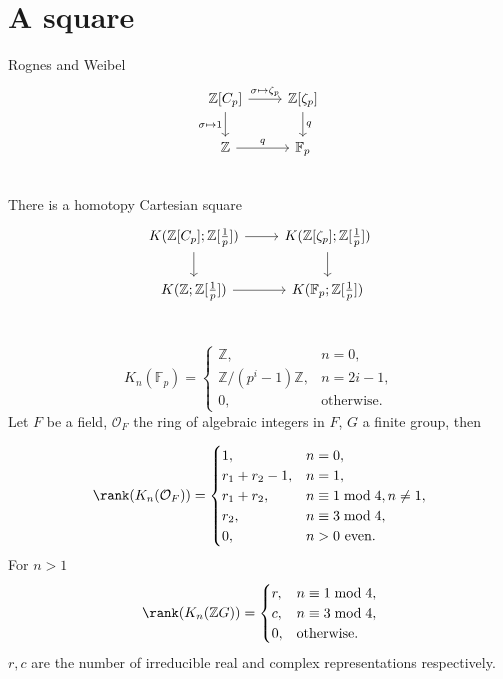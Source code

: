 \section{A square} %
Rognes and Weibel
\begin{equation}
	\begin{tikzcd}
		\mathbb{Z}[C_p] \ar[r,"\sigma\mapsto \zeta_p"] \ar[d,"\sigma\mapsto 1"']& \mathbb{Z}[\zeta_p]\ar[d,"q"]\\
		 \mathbb{Z}\ar[r,"q"] & \mathbb{F}_p\\
	\end{tikzcd}
\end{equation}
There is a homotopy Cartesian square
\begin{equation}
	\begin{tikzcd}
		K(\mathbb{Z}[C_p];\mathbb{Z}[\frac{1}{p}]) \ar[r] \ar[d]& K(\mathbb{Z}[\zeta_p];\mathbb{Z}[\frac{1}{p}]) \ar[d]\\
		 K(\mathbb{Z};\mathbb{Z}[\frac{1}{p}])\ar[r] & K(\mathbb{F}_p;\mathbb{Z}[\frac{1}{p}])\\
	\end{tikzcd}
\end{equation}

\[ K_n(\mathbb{F}_p)=\begin{cases}
 	\mathbb{Z},& n=0, \\
 	\mathbb{Z}/(p^i-1)\mathbb{Z},& n=2i-1,\\
 	0, & \text{otherwise.}
 \end{cases}\]
Let $F$ be a field, $\mathcal{O}_F$ the ring of algebraic integers in $F$, $G$ a finite group, then 

\[ \rank (K_n(\mathcal{O}_F))=\begin{cases}
 	1,& n=0, \\
 	r_1+r_2-1,& n=1,\\
 	r_1+r_2, & n\equiv 1 \bmod 4, n\neq 1,\\
 	r_2, & n\equiv 3 \bmod 4,\\
 	0, & n>0 \text{ even.}
 \end{cases}\]
For $n>1$
\[ \rank (K_n(\mathbb{Z}G))=\begin{cases}
 	r, & n\equiv 1 \bmod 4,\\
 	c, & n\equiv 3 \bmod 4,\\
 	0, & \text{otherwise.}
 \end{cases}\]
$r,c$ are the number of irreducible real and complex representations respectively.





